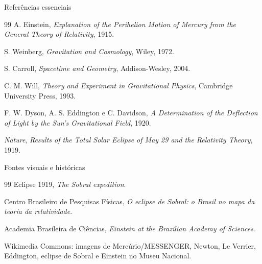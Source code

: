 \documentclass[aspectratio=169,10pt]{beamer}
\begin{document}
\begin{frame}{Referências essenciais}
  \begin{thebibliography}{99}
    A. Einstein,
    \textit{Explanation of the Perihelion Motion of Mercury from the General Theory of Relativity},
    1915.

    S. Weinberg,
    \textit{Gravitation and Cosmology},
    Wiley, 1972.

    S. Carroll,
    \textit{Spacetime and Geometry},
    Addison-Wesley, 2004.

    C. M. Will,
    \textit{Theory and Experiment in Gravitational Physics},
    Cambridge University Press, 1993.

    F. W. Dyson, A. S. Eddington e C. Davidson,
    \textit{A Determination of the Deflection of Light by the Sun's Gravitational Field},
    1920.

    \textit{Nature},
    \textit{Results of the Total Solar Eclipse of May 29 and the Relativity Theory},
    1919.
  \end{thebibliography}
\end{frame}

\begin{frame}{Fontes visuais e históricas}
  \begin{thebibliography}{99}
    Eclipse 1919,
    \textit{The Sobral expedition}.

    Centro Brasileiro de Pesquisas Físicas,
    \textit{O eclipse de Sobral: o Brasil no mapa da teoria da relatividade}.

    Academia Brasileira de Ciências,
    \textit{Einstein at the Brazilian Academy of Sciences}.

    Wikimedia Commons:
    imagens de Mercúrio/MESSENGER, Newton, Le Verrier, Eddington,
    eclipse de Sobral e Einstein no Museu Nacional.
  \end{thebibliography}
\end{frame}
\end{document}
